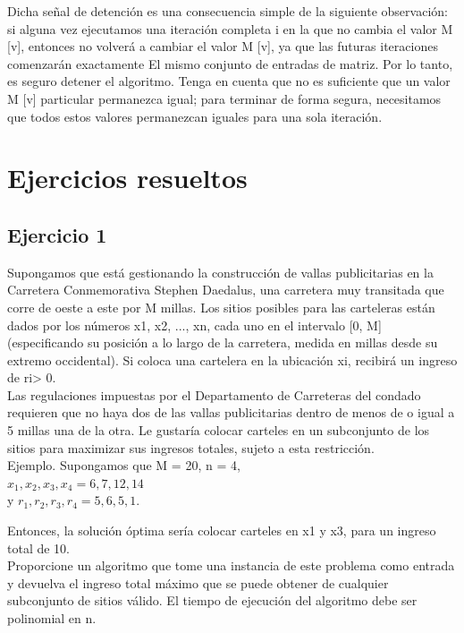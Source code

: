 \documentclass[a4paper, 12pt]{book}
\theoremstyle{dotless}
\begin{document}
Dicha señal de detención es una consecuencia simple de la siguiente observación: si alguna vez ejecutamos una iteración completa i en la que no cambia el valor M [v], entonces no volverá a cambiar el valor M [v], ya que las futuras iteraciones comenzarán exactamente El mismo conjunto de entradas de matriz. Por lo tanto, es seguro detener el algoritmo. Tenga en cuenta que no es suficiente que un valor M [v] particular permanezca igual; para terminar de forma segura, necesitamos que todos estos valores permanezcan iguales para una sola iteración.\\

\section*{Ejercicios resueltos}

\subsection*{Ejercicio 1}

Supongamos que está gestionando la construcción de vallas publicitarias en la Carretera Conmemorativa Stephen Daedalus, una carretera muy transitada que corre de oeste a este por M millas. Los sitios posibles para las carteleras están dados por los números x1, x2, ..., xn, cada uno en el intervalo [0, M] (especificando su posición a lo largo de la carretera, medida en millas desde su extremo occidental). Si coloca una cartelera en la ubicación xi, recibirá un ingreso de ri> 0.\\

Las regulaciones impuestas por el Departamento de Carreteras del condado requieren que no haya dos de las vallas publicitarias dentro de menos de o igual a 5 millas una de la otra. Le gustaría colocar carteles en un subconjunto de los sitios para maximizar sus ingresos totales, sujeto a esta restricción.\\

Ejemplo. Supongamos que M = 20, n = 4,\\

${x_1, x_2, x_3, x_4}={6, 7, 12, 14}$\\

y ${r_1, r_2, r_3, r_4}={5, 6, 5, 1}$.

Entonces, la solución óptima sería colocar carteles en x1 y x3, para un ingreso total de 10.\\

Proporcione un algoritmo que tome una instancia de este problema como entrada y devuelva el ingreso total máximo que se puede obtener de cualquier subconjunto de sitios válido. El tiempo de ejecución del algoritmo debe ser polinomial en n.\\
\end{document}

